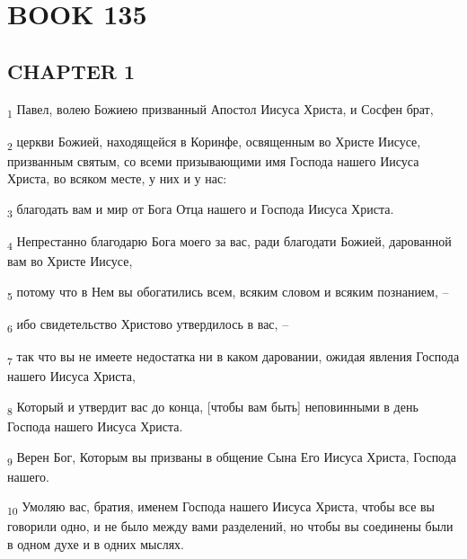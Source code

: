 \section{BOOK 135}
\subsection{CHAPTER 1}
\begin{tcolorbox}
\textsubscript{1} Павел, волею Божиею призванный Апостол Иисуса Христа, и Сосфен брат,
\end{tcolorbox}
\begin{tcolorbox}
\textsubscript{2} церкви Божией, находящейся в Коринфе, освященным во Христе Иисусе, призванным святым, со всеми призывающими имя Господа нашего Иисуса Христа, во всяком месте, у них и у нас:
\end{tcolorbox}
\begin{tcolorbox}
\textsubscript{3} благодать вам и мир от Бога Отца нашего и Господа Иисуса Христа.
\end{tcolorbox}
\begin{tcolorbox}
\textsubscript{4} Непрестанно благодарю Бога моего за вас, ради благодати Божией, дарованной вам во Христе Иисусе,
\end{tcolorbox}
\begin{tcolorbox}
\textsubscript{5} потому что в Нем вы обогатились всем, всяким словом и всяким познанием, --
\end{tcolorbox}
\begin{tcolorbox}
\textsubscript{6} ибо свидетельство Христово утвердилось в вас, --
\end{tcolorbox}
\begin{tcolorbox}
\textsubscript{7} так что вы не имеете недостатка ни в каком даровании, ожидая явления Господа нашего Иисуса Христа,
\end{tcolorbox}
\begin{tcolorbox}
\textsubscript{8} Который и утвердит вас до конца, [чтобы вам быть] неповинными в день Господа нашего Иисуса Христа.
\end{tcolorbox}
\begin{tcolorbox}
\textsubscript{9} Верен Бог, Которым вы призваны в общение Сына Его Иисуса Христа, Господа нашего.
\end{tcolorbox}
\begin{tcolorbox}
\textsubscript{10} Умоляю вас, братия, именем Господа нашего Иисуса Христа, чтобы все вы говорили одно, и не было между вами разделений, но чтобы вы соединены были в одном духе и в одних мыслях.
\end{tcolorbox}
